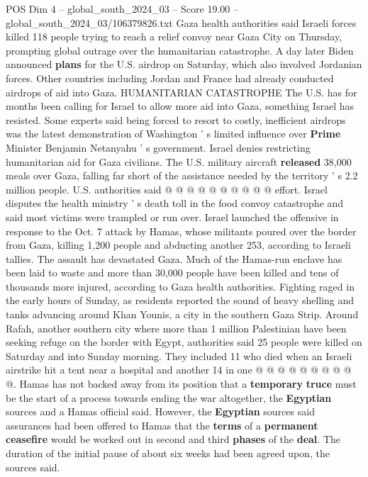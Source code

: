 \begin{textsample}{POS Dim 4 – global\_south\_2024\_03 – Score 19.00 – global\_south\_2024\_03/106379826.txt}
Gaza health authorities said Israeli forces killed 118 people trying to reach a relief convoy near Gaza City on Thursday, prompting global outrage over the humanitarian catastrophe.
A day later Biden announced \textbf{plans} for the U.S. airdrop on Saturday, which also involved Jordanian forces.
Other countries including Jordan and France had already conducted airdrops of aid into Gaza.
HUMANITARIAN CATASTROPHE The U.S. has for months been calling for Israel to allow more aid into Gaza, something Israel has resisted.
Some experts said being forced to resort to costly, inefficient airdrops was the latest demonstration of Washington ' s limited influence over \textbf{Prime} Minister Benjamin Netanyahu ' s government.
Israel denies restricting humanitarian aid for Gaza civilians.
The U.S. military aircraft \textbf{released} 38,000 meals over Gaza, falling far short of the assistance needed by the territory ' s 2.2 million people.
U.S. authorities said @ @ @ @ @ @ @ @ @ @ effort.
Israel disputes the health ministry ' s death toll in the food convoy catastrophe and said most victims were trampled or run over.
Israel launched the offensive in response to the Oct. 7 attack by Hamas, whose militants poured over the border from Gaza, killing 1,200 people and abducting another 253, according to Israeli tallies.
The assault has devastated Gaza.
Much of the Hamas-run enclave has been laid to waste and more than 30,000 people have been killed and tens of thousands more injured, according to Gaza health authorities.
Fighting raged in the early hours of Sunday, as residents reported the sound of heavy shelling and tanks advancing around Khan Younis, a city in the southern Gaza Strip.
Around Rafah, another southern city where more than 1 million Palestinian have been seeking refuge on the border with Egypt, authorities said 25 people were killed on Saturday and into Sunday morning.
They included 11 who died when an Israeli airstrike hit a tent near a hospital and another 14 in one @ @ @ @ @ @ @ @ @ @.
Hamas has not backed away from its position that a \textbf{temporary} \textbf{truce} must be the start of a process towards ending the war altogether, the \textbf{Egyptian} sources and a Hamas official said.
However, the \textbf{Egyptian} sources said assurances had been offered to Hamas that the \textbf{terms} of a \textbf{permanent} \textbf{ceasefire} would be worked out in second and third \textbf{phases} of the \textbf{deal}.
The duration of the initial pause of about six weeks had been agreed upon, the sources said.

\end{textsample}
